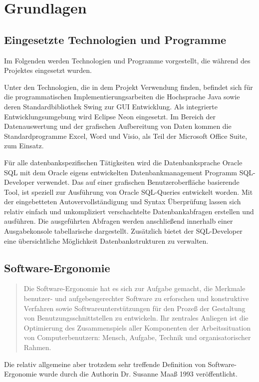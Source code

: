 \section{Grundlagen}

\subsection{Eingesetzte Technologien und Programme}
Im Folgenden werden Technologien und Programme vorgestellt, die während des Projektes eingesetzt wurden.

Unter den Technologien, die in dem Projekt Verwendung finden, befindet sich für die programmatischen Implementierungsarbeiten die Hochsprache Java sowie deren Standardbibliothek Swing zur GUI Entwicklung. Als integrierte Entwicklungsumgebung wird Eclipse Neon eingesetzt. Im Bereich der Datenauswertung und der grafischen Aufbereitung von Daten kommen die Standardprogramme Excel, Word und Visio, als Teil der Microsoft Office Suite, zum Einsatz. 

Für alle datenbankspezifischen Tätigkeiten wird die Datenbanksprache Oracle SQL mit dem Oracle eigens entwickelten Datenbankmanagement Programm SQL-Developer verwendet. Das auf einer grafischen Benutzeroberfläche basierende Tool, ist speziell zur Ausführung von Oracle SQL-Queries entwickelt worden. Mit der eingebetteten Autovervollständigung und Syntax Überprüfung lassen sich relativ einfach und unkompliziert verschachtelte Datenbankabfragen erstellen und ausführen. Die ausgeführten Abfragen werden anschließend innerhalb einer Ausgabekonsole tabellarische dargestellt. Zusätzlich bietet der SQL-Developer eine übersichtliche Möglichkeit Datenbankstrukturen zu verwalten. 

\subsection{Software-Ergonomie}
\begin{quote}
    Die Software-Ergonomie hat es sich zur Aufgabe gemacht, die Merkmale benutzer- und aufgebengerechter Software zu erforschen und konstruktive Verfahren sowie Softwareunterstützungen für den Prozeß der Gestaltung von Benutzungsschnittstellen zu entwickeln. Ihr zentrales Anliegen ist die Optimierung des Zusammenspiels aller Komponenten der Arbeitssituation von Computerbenutzern: Mensch, Aufgabe, Technik und organisatorischer Rahmen. \citep{Maass1993}
  \end{quote}
Die relativ allgemeine aber trotzdem sehr treffende Definition von Software-Ergonomie wurde durch die Authorin Dr. Susanne Maaß 1993 veröffentlicht.

